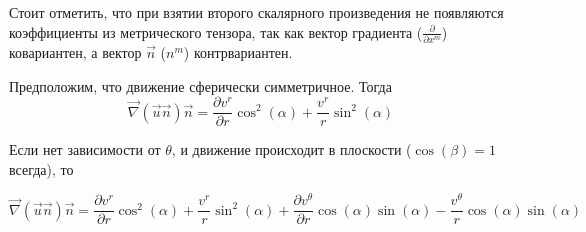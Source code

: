 \documentclass{article}
\begin{document}
Стоит отметить, что при взятии второго скалярного произведения не появляются коэффициенты из метрического тензора, так как вектор градиента ($\frac{\partial}{\partial x^m}$) ковариантен, а вектор $\vec{n}$ ($n^m$) контрвариантен.

Предположим, что движение сферически симметричное. Тогда
\[
\vec{\nabla}(\vec{u}\vec{n})\vec{n} = \frac{\partial v^r}{\partial r}\cos^2(\alpha) + \frac{v^r}{r}\sin^2(\alpha)
\]

Если нет зависимости от $\theta$, и движение происходит в плоскости ($\cos(\beta) = 1$ всегда), то 


\[
\vec{\nabla}(\vec{u}\vec{n})\vec{n} = \frac{\partial v^r}{\partial r}\cos^2(\alpha) + \frac{v^r}{r}\sin^2(\alpha)+ \frac{\partial v^{\theta}}{\partial r} \cos(\alpha)\sin(\alpha) - \frac{v^{\theta}}{r}\cos(\alpha)\sin(\alpha)
\]
\end{document}
